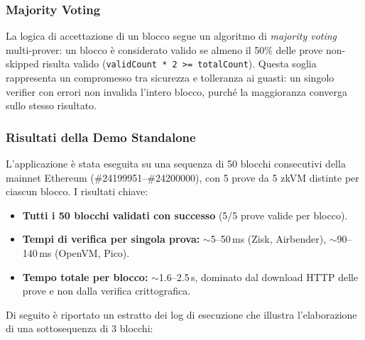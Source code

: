 \documentclass[12pt,a4paper,openright,twoside]{report}
\begin{document}
\subsubsection{Majority Voting}

La logica di accettazione di un blocco segue un algoritmo di \textit{majority voting} multi-prover: un blocco è considerato valido se almeno il 50\% delle prove non-skipped risulta valido (\texttt{validCount * 2 >= totalCount}). Questa soglia rappresenta un compromesso tra sicurezza e tolleranza ai guasti: un singolo verifier con errori non invalida l'intero blocco, purché la maggioranza converga sullo stesso risultato.

\subsubsection{Risultati della Demo Standalone}

L'applicazione è stata eseguita su una sequenza di 50 blocchi consecutivi della mainnet Ethereum (\#24199951--\#24200000), con 5 prove da 5 zkVM distinte per ciascun blocco. I risultati chiave:

\begin{itemize}
    \item \textbf{Tutti i 50 blocchi validati con successo} (5/5 prove valide per blocco).
    \item \textbf{Tempi di verifica per singola prova:} $\sim$5--50\,ms (Zisk, Airbender), $\sim$90--140\,ms (OpenVM, Pico).
    \item \textbf{Tempo totale per blocco:} $\sim$1.6--2.5\,s, dominato dal download HTTP delle prove e non dalla verifica crittografica.
\end{itemize}

Di seguito è riportato un estratto dei log di esecuzione che illustra l'elaborazione di una sottosequenza di 3 blocchi:
\end{document}

